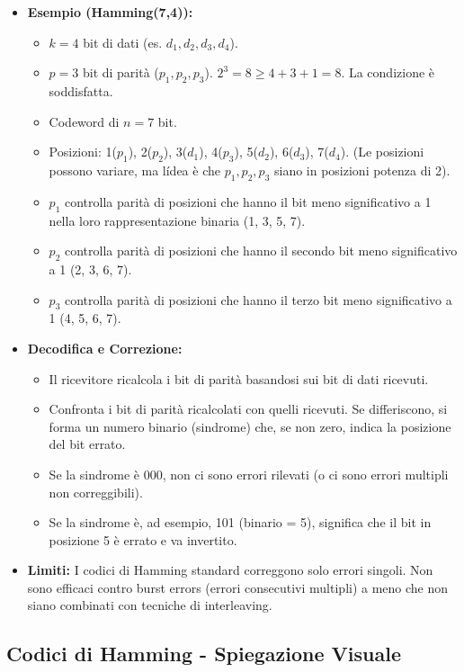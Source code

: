 \begin{itemize}
\begin{itemize}
    \end{itemize}
    \item \textbf{Esempio (Hamming(7,4)):}
    \begin{itemize}
        \item $k=4$ bit di dati (es. $d_1, d_2, d_3, d_4$).
        \item $p=3$ bit di parità ($p_1, p_2, p_3$). $2^3 = 8 \ge 4+3+1 = 8$. La condizione è soddisfatta.
        \item Codeword di $n=7$ bit.
        \item Posizioni: 1($p_1$), 2($p_2$), 3($d_1$), 4($p_3$), 5($d_2$), 6($d_3$), 7($d_4$). (Le posizioni possono variare, ma l\'idea è che $p_1, p_2, p_3$ siano in posizioni potenza di 2).
        \item $p_1$ controlla parità di posizioni che hanno il bit meno significativo a 1 nella loro rappresentazione binaria (1, 3, 5, 7).
        \item $p_2$ controlla parità di posizioni che hanno il secondo bit meno significativo a 1 (2, 3, 6, 7).
        \item $p_3$ controlla parità di posizioni che hanno il terzo bit meno significativo a 1 (4, 5, 6, 7).
    \end{itemize}
    \item \textbf{Decodifica e Correzione:}
    \begin{itemize}
        \item Il ricevitore ricalcola i bit di parità basandosi sui bit di dati ricevuti.
        \item Confronta i bit di parità ricalcolati con quelli ricevuti. Se differiscono, si forma un numero binario (sindrome) che, se non zero, indica la posizione del bit errato.
        \item Se la sindrome è 000, non ci sono errori rilevati (o ci sono errori multipli non correggibili).
        \item Se la sindrome è, ad esempio, 101 (binario = 5), significa che il bit in posizione 5 è errato e va invertito.
    \end{itemize}
    \item \textbf{Limiti:} I codici di Hamming standard correggono solo errori singoli. Non sono efficaci contro burst errors (errori consecutivi multipli) a meno che non siano combinati con tecniche di interleaving.
\end{itemize}


\subsection{Codici di Hamming - Spiegazione Visuale}

